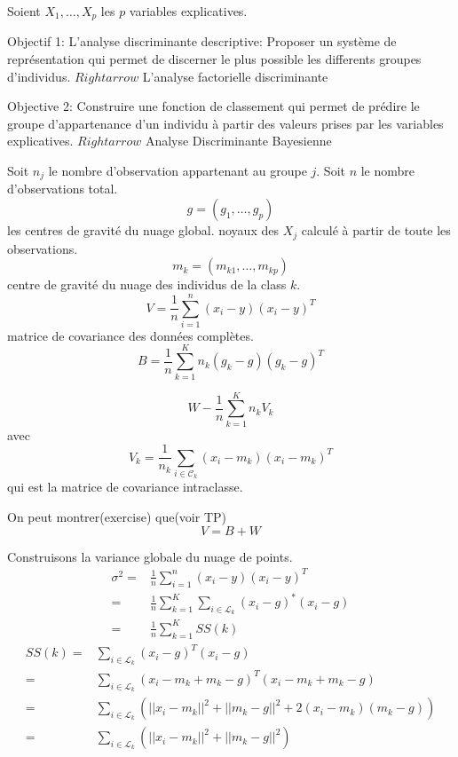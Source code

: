 \documentclass{article}
\begin{document}
Soient $X_1,\ldots,X_p$ les $p$ variables explicatives.

Objectif 1: L'analyse discriminante
descriptive: Proposer un syst\`eme de repr\'esentation qui permet de discerner le plus possible les differents groupes d'individus.
$Rightarrow$ L'analyse factorielle discriminante

Objective 2: Construire une fonction de classement qui permet de pr\'edire le groupe d'appartenance d'un individu \`a partir des valeurs prises par les variables explicatives.
$Rightarrow$ Analyse Discriminante Bayesienne

Soit $n_j$ le nombre d'observation appartenant au groupe $j$. Soit $n$ le nombre d'observations total.
\begin{equation}
g=(g_1,\ldots,g_p)
\end{equation}
les centres de gravit\'e du nuage global.
noyaux des $X_j$ calcul\'e \`a partir de toute les observations.
\begin{equation}
m_k=(m_{k1},\ldots,m_{kp})
\end{equation}
centre de gravit\'e du nuage des individus de la class $k$.
\begin{equation}
V=\frac{1}{n}\sum_{i=1}^{n}(x_i-y)(x_i-y)^T
\end{equation}
matrice de covariance des donn\'ees compl\`etes.
\begin{equation}
B=\frac{1}{n}\sum_{k=1}^Kn_k(g_k-g)(g_k-g)^T
\end{equation}

\begin{equation}
W-\frac{1}{n}\sum_{k=1}^{K}n_kV_k
\end{equation}
avec
\begin{equation}
V_k=\frac{1}{n_k}\sum_{i \in \mathcal{C}_k}(x_i-m_k)(x_i-m_k)^T
\end{equation}
qui est la matrice de covariance intraclasse.

On peut montrer(exercise) que(voir TP)
\begin{equation}
V=B+W
\end{equation} 

Construisons la variance globale du nuage de points.
\begin{equation}
\begin{split}
\sigma^2=&\frac{1}{n}\sum_{i=1}^n(x_i-y)(x_i-y)^T\\
=&\frac{1}{n}\sum_{k=1}^K\sum_{i\in\mathcal{L}_k}(x_i-g)^*(x_i-g)\\
=&\frac{1}{n}\sum_{k=1}^KSS(k)
\end{split}
\end{equation}
\begin{equation}
\begin{split}
SS(k)=&\sum_{i\in\mathcal{L}_k}(x_i-g)^T(x_i-g)\\
=&\sum_{i\in\mathcal{L}_k}(x_i-m_k+m_k-g)^T(x_i-m_k+m_k-g)\\
=&\sum_{i\in\mathcal{L}_k}(||x_i-m_k||^2+||m_k-g||^2+2(x_i-m_k)(m_k-g))\\
=&\sum_{i\in\mathcal{L}_k}(||x_i-m_k||^2+||m_k-g||^2)
\end{split}
\end{equation}
\end{document}
